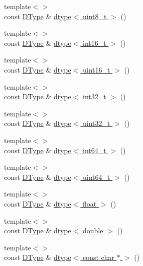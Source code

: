 \begin{DoxyCompactItemize}
{\footnotesize template$<$$>$ }\\const \hyperlink{class_h5_t_l_1_1_d_type}{D\-Type} \& \hyperlink{namespace_h5_t_l_a5583c20a945634c741c4c006f5abd3a6}{dtype$<$ uint8\-\_\-t $>$} ()
\item 
{\footnotesize template$<$$>$ }\\const \hyperlink{class_h5_t_l_1_1_d_type}{D\-Type} \& \hyperlink{namespace_h5_t_l_ac159834e78342cf3e5daf694c65b0dc9}{dtype$<$ int16\-\_\-t $>$} ()
\item 
{\footnotesize template$<$$>$ }\\const \hyperlink{class_h5_t_l_1_1_d_type}{D\-Type} \& \hyperlink{namespace_h5_t_l_a0a256efae396de32f6c8e17a0ac5b410}{dtype$<$ uint16\-\_\-t $>$} ()
\item 
{\footnotesize template$<$$>$ }\\const \hyperlink{class_h5_t_l_1_1_d_type}{D\-Type} \& \hyperlink{namespace_h5_t_l_a18b8ab0e48c3efb5dca7d93efd1bfbf6}{dtype$<$ int32\-\_\-t $>$} ()
\item 
{\footnotesize template$<$$>$ }\\const \hyperlink{class_h5_t_l_1_1_d_type}{D\-Type} \& \hyperlink{namespace_h5_t_l_aa42336b53e3ba0b95d2495ba8084df67}{dtype$<$ uint32\-\_\-t $>$} ()
\item 
{\footnotesize template$<$$>$ }\\const \hyperlink{class_h5_t_l_1_1_d_type}{D\-Type} \& \hyperlink{namespace_h5_t_l_a1c8362f6cee0689275ecfddccba88274}{dtype$<$ int64\-\_\-t $>$} ()
\item 
{\footnotesize template$<$$>$ }\\const \hyperlink{class_h5_t_l_1_1_d_type}{D\-Type} \& \hyperlink{namespace_h5_t_l_a112af217f39b59064ce8a48cccc74764}{dtype$<$ uint64\-\_\-t $>$} ()
\item 
{\footnotesize template$<$$>$ }\\const \hyperlink{class_h5_t_l_1_1_d_type}{D\-Type} \& \hyperlink{namespace_h5_t_l_a603d589a4de14384ef7d47104e6a7862}{dtype$<$ float $>$} ()
\item 
{\footnotesize template$<$$>$ }\\const \hyperlink{class_h5_t_l_1_1_d_type}{D\-Type} \& \hyperlink{namespace_h5_t_l_ab549a1bd6205a5bff9dc8e5ca83fa76a}{dtype$<$ double $>$} ()
\item 
{\footnotesize template$<$$>$ }\\const \hyperlink{class_h5_t_l_1_1_d_type}{D\-Type} \& \hyperlink{namespace_h5_t_l_adcc1829002ae4d479fad02d0bf47f793}{dtype$<$ const char $\ast$ $>$} ()

\end{DoxyCompactItemize}
